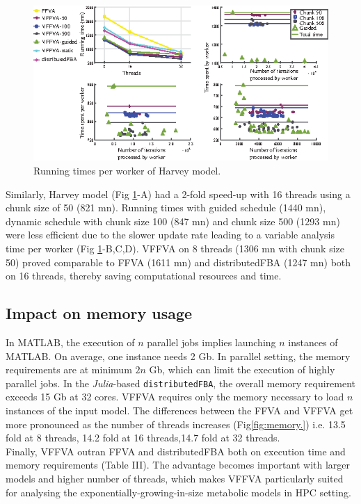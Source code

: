 \documentclass[letterpaper, 10 pt, conference]{ieeeconf}  %
\begin{document}
\begin{figure}[!htb]
\centering
\includegraphics[scale=1.5]{figures/figure4/harvey.eps}
\caption{Running times per worker of Harvey model.}
\label{fig:harvey.}
\end{figure}

Similarly, Harvey model (Fig \ref{fig:harvey.}-A) had a 2-fold speed-up with 16 threads using a chunk size of 50 (821 mn). Running times with guided schedule (1440 mn), dynamic schedule with chunk size 100 (847 mn) and chunk size 500 (1293 mn) were less efficient due to the slower update rate leading to a variable analysis time per worker (Fig \ref{fig:harvey.}-B,C,D). VFFVA on 8 threads (1306 mn with chunk size 50) proved comparable to FFVA (1611 mn) and distributedFBA (1247 mn) both on 16 threads, thereby saving computational resources and time. 

\subsection{Impact on memory usage}

In MATLAB, the execution of $n$ parallel jobs implies launching $n$ instances of MATLAB. On average, one instance needs 2 Gb. In parallel setting, the memory requirements are at minimum $2n$ Gb, which can limit the execution of highly parallel jobs. In the \textit{Julia}-based \texttt{distributedFBA}, the overall memory requirement exceeds 15 Gb at 32 cores. VFFVA requires only the memory necessary to load $n$ instances of the input model. The differences between the FFVA and VFFVA get more pronounced as the number of threads increases (Fig\ref{fig:memory.}) i.e. 13.5 fold at 8 threads, 14.2 fold at 16 threads,14.7 fold at 32 threads.\\
Finally, VFFVA outran FFVA and distributedFBA both on execution time and memory requirements (Table III). The advantage becomes important with larger models and higher number of threads, which makes VFFVA particularly suited for analysing the exponentially-growing-in-size metabolic models in HPC setting.
\end{document}
